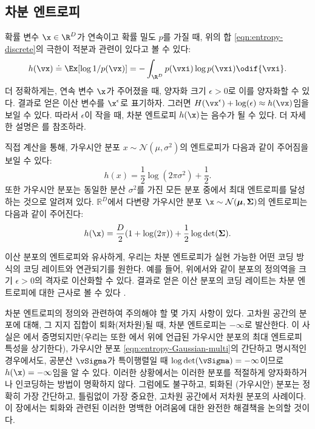 \documentclass[../../book-main_ko.tex]{subfiles}
\begin{document}
\subsection{차분 엔트로피}

확률 변수 $\x \in \R^{D}$가 연속이고 확률 밀도 $p$를 가질 때, 위의 합 \eqref{eqn:entropy-discrete}의 극한이 적분과 관련이 있다고 볼 수 있다:
\begin{equation}
	h(\vx) \doteq \Ex[\log 1/p(\vx)] = - \int_{\R^{D}} p(\vxi) \log p(\vxi) \odif{\vxi}.
	\label{eqn:entropy-differential}
\end{equation}
{더 정확하게는, 연속 변수 $\x$가 주어졌을 때, 양자화 크기 $\epsilon > 0$로 이를 양자화할 수 있다. 결과로 얻은 이산 변수를 $\x^\epsilon$로 표기하자. 그러면 $H(\vx^\epsilon) + \log(\epsilon) \approx h(\vx)$임을 보일 수 있다. 따라서 $\epsilon$이 작을 때, 차분 엔트로피 $h(\x)$는 음수가 될 수 있다. 더 자세한 설명은 \cite{Cover-Thomas}를 참조하라.}

\begin{example}
	직접 계산을 통해, 가우시안 분포 $x \sim \mathcal{N}(\mu, \sigma^2)$의 엔트로피가 다음과 같이 주어짐을 보일 수 있다:
	\begin{equation}
		h(x) = \frac{1}{2}\log (2\pi \sigma^2) + \frac{1}{2}.
		\label{eqn:entropy-Gaussian}
	\end{equation}
	또한 가우시안 분포는 동일한 분산 $\sigma^2$를 가진 모든 분포 중에서 최대 엔트로피를 달성하는 것으로 알려져 있다. $\mathbb{R}^D$에서 다변량 가우시안 분포 $\x \sim \mathcal{N}(\boldsymbol{\mu}, \boldsymbol{\Sigma})$의 엔트로피는 다음과 같이 주어진다:
	\begin{equation}
		h(\x) = \frac{D}{2}(1 + \log(2\pi)) + \frac{1}{2}\log\det(\boldsymbol{\Sigma}).
		\label{eqn:entropy-Gaussian-multi}
	\end{equation}
\end{example}

이산 분포의 엔트로피와 유사하게, 우리는 차분 엔트로피가 실현 가능한 어떤 코딩 방식의 코딩 레이트와 연관되기를 원한다. 예를 들어, 위에서와 같이 분포의 정의역을 크기 $\epsilon >0$의 격자로 이산화할 수 있다. 결과로 얻은 이산 분포의 코딩 레이트는 차분 엔트로피에 대한 근사로 볼 수 있다 \cite{Cover-Thomas}.


차분 엔트로피의 정의와 관련하여 주의해야 할 몇 가지 사항이 있다. 고차원 공간의 분포에 대해, 그 지지 집합이 퇴화(저차원)될 때, 차분 엔트로피는 \(-\infty\)로 발산한다. 이 사실은 에서 증명되지만(우리는 또한 에서 위에 언급된 가우시안 분포의 최대 엔트로피 특성을 상기한다), 가우시안 분포 \eqref{eqn:entropy-Gaussian-multi}의 간단하고 명시적인 경우에서도, 공분산 \(\vSigma\)가 특이행렬일 때 \(\log\det(\vSigma) = -\infty\)이므로 $h(\x) = -\infty$임을 알 수 있다. 이러한 상황에서는 이러한 분포를 적절하게 양자화하거나 인코딩하는 방법이 명확하지 않다. 그럼에도 불구하고, 퇴화된 (가우시안) 분포는 정확히 가장 간단하고, 틀림없이 가장 중요한, 고차원 공간에서 저차원 분포의 사례이다. 이 장에서는 퇴화와 관련된 이러한 명백한 어려움에 대한 완전한 해결책을 논의할 것이다.
\end{document}

